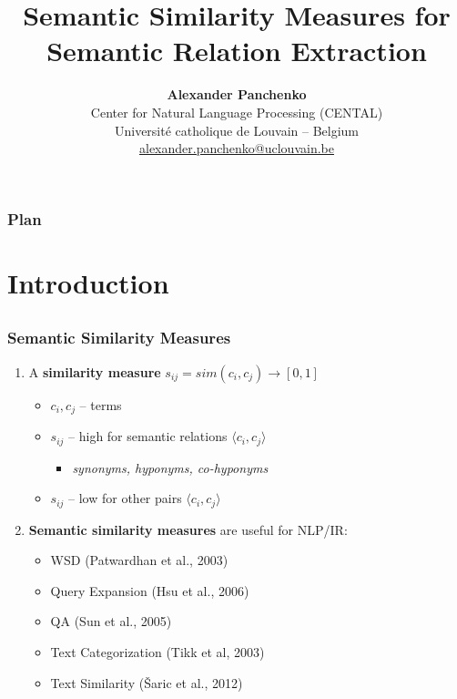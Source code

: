 \documentclass{beamer}
\title[\insertframenumber/\inserttotalframenumber]
{\textbf{Semantic Similarity Measures  for Semantic Relation Extraction}}
\author[Alexander Panchenko]
{\textbf{Alexander Panchenko} \\ Center for Natural Language Processing (CENTAL)\\ Université catholique de Louvain -- Belgium \\ { \url{alexander.panchenko@uclouvain.be}  }}
\begin{document}
\begin{frame}
  \titlepage
\end{frame}

\begin{frame}
  \setcounter{tocdepth}{1}
  \frametitle{Plan}
  \tableofcontents
  \setcounter{tocdepth}{2}
	
\end{frame}

\section{Introduction}
\subsection{}

\begin{frame}
\frametitle{Semantic Similarity Measures}

\begin{enumerate}
  \item A \textbf{similarity measure} $s_{ij} = sim(c_i, c_j) \rightarrow [0,1]$
  \begin{itemize}
    \item $c_i, c_j$ -- terms
    \item $s_{ij}$ -- high for semantic relations $\langle c_i, c_j \rangle$
    \begin{itemize}
     \item \textit{synonyms, hyponyms, co-hyponyms}
     \end{itemize}
    \item $s_{ij}$ -- low for other pairs $\langle c_i, c_j \rangle$
  \end{itemize}
   
\item \textbf{Semantic similarity measures} are useful for NLP/IR:
\begin{itemize}
  \item WSD (Patwardhan et al., 2003)
  \item Query Expansion (Hsu et al., 2006)
  \item QA (Sun et al., 2005)	
  \item Text Categorization (Tikk et al, 2003)
  \item Text Similarity (Šaric et al., 2012)
\end{itemize}
\end{enumerate}
\end{frame}
\end{document}

